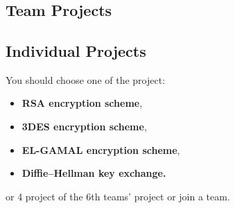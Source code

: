 \documentclass[12pt,addpoints]{exam}		%
\begin{document}
\section{}
\subsection*{Team Projects}
\begin{questions}





\end{questions}
\subsection*{Individual Projects}
You should choose one of the project: 
\begin{itemize}
  \item \textbf{RSA encryption scheme},
  \item \textbf{3DES encryption scheme}, 
  \item \textbf{EL-GAMAL encryption scheme}, 
  \item \textbf{Diffie--Hellman key exchange.}
\end{itemize}

or 4 project of the 6th teams' project or join a team.
\end{document}
